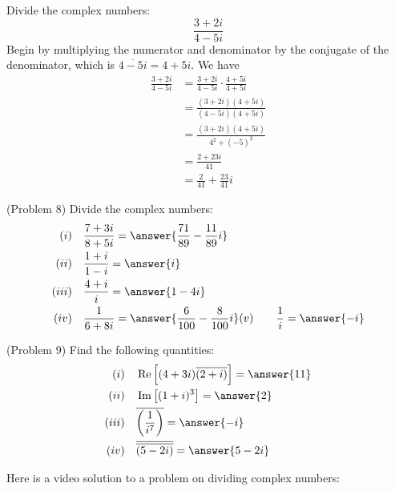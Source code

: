 \documentclass[handout]{ximera}
\begin{document}
\begin{example}[Example 8]
Divide the complex numbers:
\[
\frac{3+2i}{4-5i} 
\]
Begin by multiplying the numerator and denominator by the conjugate of the denominator, 
which is $\overline {4-5i} = 4+5i$.
We have
\begin{align*}
\frac{3+2i}{4-5i} &= \frac{3+2i}{4-5i} \cdot \frac{4+5i}{4+5i} \\[9 pt]
                  &= \frac{(3+2i)(4+5i)}{(4-5i)(4+5i)}\\[9pt]
									&= \frac{(3+2i)(4+5i)}{4^2 +(-5)^2}\\[8pt]
                  &= \frac{2+23i}{41}\\[7pt]
                  &= \frac{2}{41} + \frac{23}{41}i
\end{align*}
\end{example}


\begin{problem}(Problem 8)
Divide the complex numbers:
\begin{align*}
(i)& \quad  \frac{7+3i}{8+5i} = \answer{\frac{71}{89} -\frac{11}{89}i}\\
(ii)& \quad\frac{1+i}{1-i} = \answer{i}\\
(iii)& \quad\frac{4+i}{i} = \answer{1-4i}\\
(iv)& \quad\frac{1}{6+8i} = \answer{\frac{6}{100} - \frac{8}{100}i}
(v)&\quad \frac{1}{i} = \answer{-i}
\end{align*}
\end{problem}


\begin{problem}(Problem 9)
Find the following quantities:
\begin{align*}
(i)& \quad \Rep\left[(4+3i)\overline{(2+i)}\right] = \answer{11}\\
(ii)& \quad \Imp\left[(1+i)^3\right] = \answer{2}\\
(iii)& \quad \overline{\left(\frac{1}{i^7}\right)} = \answer{-i}\\
(iv)& \quad \overline{\overline{(5-2i)}} = \answer{5-2i}
\end{align*}
\end{problem}

Here is a video solution to a problem on dividing complex numbers:

\begin{foldable}
\unfoldable
{}
\end{foldable}
\end{document}

